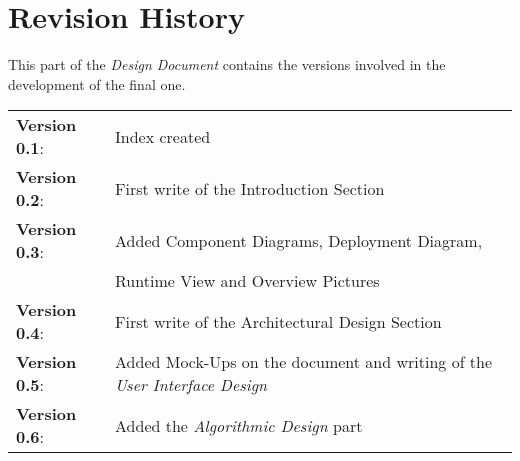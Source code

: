 \section{Revision History}

This part of the \emph{Design Document} contains the versions involved in the development of the final one.

\vspace{10pt}

\begin{tabular}{l l}

	\textbf{Version 0.1}:   & Index created \\
	\textbf{Version 0.2}:   & First write of the Introduction Section \\
	\textbf{Version 0.3}:   & Added Component Diagrams, Deployment Diagram, \\
	                        & Runtime View and Overview Pictures \\
	\textbf{Version 0.4}:   & First write of the Architectural Design Section \\
	\textbf{Version 0.5}:   & Added Mock-Ups on the document and writing of the \emph{User Interface Design} \\
	\textbf{Version 0.6}:   & Added the \emph{Algorithmic Design} part \\
	
\end{tabular}